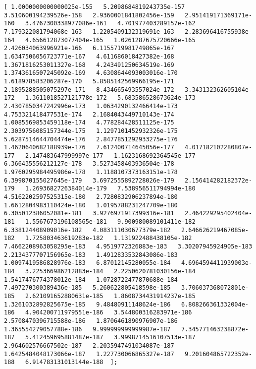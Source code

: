 \documentclass[11pt]{article}
\begin{document}
\begin{Verbatim}[commandchars=\\\{\}]
[ 1.0000000000000025e-155   5.2098684819243735e-157   3.510600194239526e-158   2.9360001841802456e-159   2.951419171369171e-160   3.4767300338977086e-161   4.701977403289157e-162   7.179322081794068e-163   1.2205409132319691e-163   2.283696416755938e-164   4.656612873077404e-165   1.0261287675720666e-165   2.426034063996921e-166   6.1155719981749865e-167   1.6347506056723771e-167   4.611686018427382e-168   1.3671816253011327e-168   4.243491250634519e-169   1.3743616507245092e-169   4.6308644093003016e-170   1.618978583206287e-170   5.8585142569966195e-171   2.1895288505075297e-171   8.434665493557024e-172   3.343132362605104e-172   1.3611018527121778e-172   5.683586528673624e-173   2.4307850347242996e-173   1.0634290132466414e-173   4.753321418477531e-174   2.1684043449710143e-174   1.0085569853459118e-174   4.778284428511125e-175   2.3039756085157344e-175   1.1297101452932326e-175   5.6287514644704474e-176   2.8477851292933275e-176   1.4620640682188939e-176   7.612400714645056e-177   4.017182102280807e-177   2.147483647999997e-177   1.1623168692364545e-177   6.366435556212127e-178   3.5273458403936504e-178   1.9760295984495986e-178   1.1188107373163151e-178   6.399870155027645e-179   3.6972555892728026e-179   2.156414282182372e-179   1.2693682726384014e-179   7.538956511794994e-180   4.5162202597525315e-180   2.7280832906237894e-180   1.6612804983110424e-180   1.0195788231247709e-180   6.305012386052081e-181   3.9276971917399316e-181   2.464229295402404e-181   1.5567673196108565e-181   9.900980089101411e-182   6.338124408909016e-182   4.083111030677379e-182   2.646626219467085e-182   1.725803463619283e-182   1.131922488438105e-182   7.4662208963058295e-183   4.9519772326883e-183   3.30207945924905e-183   2.2134377707156965e-183   1.4912833532843086e-183   1.0097419586828976e-183   6.87012145280055e-184   4.6964594411939003e-184   3.225366986212883e-184   2.2250620781030156e-184   1.5417476774378012e-184   1.0728722477870688e-184   7.497270300389436e-185   5.260622805418598e-185   3.706037368072801e-185   2.621091652880631e-185   1.8608734431914237e-185   1.3261032892825675e-185   9.48480911148624e-186   6.808266361332004e-186   4.904200711979551e-186   3.544800316283971e-186   2.5708470396715588e-186   1.8706461890976907e-186   1.365554279057788e-186   9.999999999999987e-187   7.345771463238872e-187   5.412459695881487e-187   3.9998714516107513e-187   2.964602576667502e-187   2.2035947491034087e-187   1.6425484048173066e-187   1.227730066865327e-187   9.201604865722352e-188   6.914783131013144e-188  ];

\end{Verbatim}
\end{document}
